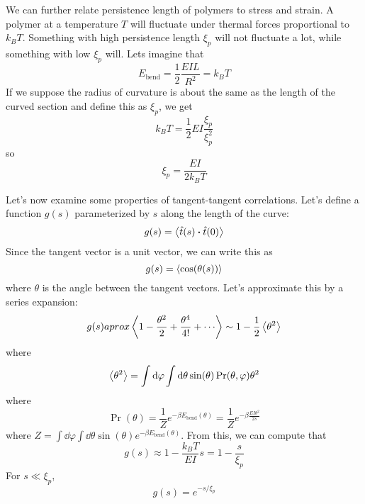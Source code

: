 \documentclass[a4paper,twoside,master.tex]{subfiles}
\begin{document}
We can further relate persistence length of polymers to stress and strain. A polymer at a temperature $ T $ will fluctuate under thermal forces proportional to $ k_B T $. Something with high persistence length $ \xi_p $ will not fluctuate a lot, while something with low $ \xi_p $ will. Lets imagine that
\begin{equation}
    E_\text{bend} = \frac{1}{2} \frac{EIL}{R^2} = k_B T
\end{equation}
If we suppose the radius of curvature is about the same as the length of the curved section and define this as $ \xi_p $, we get
\begin{equation}
    k_B T = \frac{1}{2} EI \frac{\xi_p}{\xi_p^2}
\end{equation}
so
\begin{equation}
    \xi_p = \frac{E I}{2k_B T}
\end{equation}

Let's now examine some properties of tangent-tangent correlations. Let's define a function $ g(s) $ parameterized by $ s $ along the length of the curve:
\begin{equation}
    g(s) = \ev{\hat{t}(s) \vdot \hat{t}(0)}
\end{equation}
Since the tangent vector is a unit vector, we can write this as
\begin{equation}
    g(s) = \ev{\cos(\theta(s))}
\end{equation}
where $ \theta $ is the angle between the tangent vectors. Let's approximate this by a series expansion:
\begin{equation}
    g(s) aprox \ev{1 - \frac{\theta^2}{2} + \frac{\theta^4}{4!} + \cdots} \sim 1 - \frac{1}{2} \ev{\theta^2}
\end{equation}
where
\begin{equation}
    \ev{\theta^2} = \int \dd{\varphi} \int \dd{\theta} \sin(\theta) \Pr(\theta, \varphi) \theta^2
\end{equation}
where
\begin{equation}
    \Pr(\theta) = \frac{1}{Z} e^{- \beta E_{\text{bend}}(\theta)} = \frac{1}{Z} e^{- \beta \frac{E I \theta^2}{2s}}
\end{equation}
where $ Z = \int \dd{\varphi} \int \dd{\theta} \sin(\theta) e^{- \beta E_{\text{bend}}(\theta)} $. From this, we can compute that
\begin{equation}
    g(s) \approx 1 - \frac{k_B T}{EI} s = 1 - \frac{s}{\xi_p}
\end{equation}
For $ s \ll \xi_p $,
\begin{equation}
    g(s) = e^{- s / \xi_p}
\end{equation}
\end{document}
